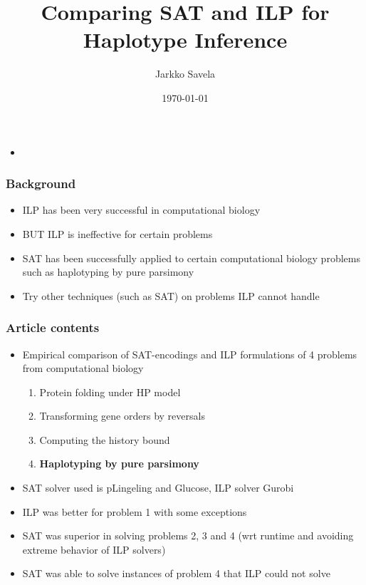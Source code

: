 \documentclass[handout]{beamer}
\title[]{Comparing SAT and ILP for Haplotype Inference} %
\author{Jarkko Savela} %
\institute{University of Helsinki} %
\date{\today} %
\begin{document}
\begin{frame}
\titlepage %
\end{frame}

\begin{frame}
\begin{itemize}
\item {}
\end{itemize}
\end{frame}

\begin{frame}
\frametitle{Background}
\begin{itemize}
\item ILP has been very successful in computational biology~\cite{gusfield2019integer}
\item BUT ILP is ineffective for certain problems
\item SAT has been successfully applied to certain computational biology problems such as haplotyping by pure parsimony~\cite{DBLP:conf/aaai/LynceM06, DBLP:journals/anor/GracaMLO11, DBLP:journals/jda/JagerCZ16}
\item Try other techniques (such as SAT) on problems ILP cannot handle
\end{itemize}
\end{frame}

\begin{frame}
\frametitle{Article contents}
\begin{itemize}
\item Empirical comparison of SAT-encodings and ILP formulations of 4 problems from computational biology
\begin{enumerate}
\item Protein folding under HP model
\item Transforming gene orders by reversals
\item Computing the history bound
\item \textbf{Haplotyping by pure parsimony}
\end{enumerate}
\item SAT solver used is pLingeling and Glucose, ILP solver Gurobi
\item ILP was better for problem 1 with some exceptions
\item SAT was superior in solving problems 2, 3 and 4 (wrt runtime and avoiding extreme behavior of ILP solvers)
\item SAT was able to solve instances of problem 4 that ILP could not solve
\end{itemize}
\end{frame}
\end{document}

